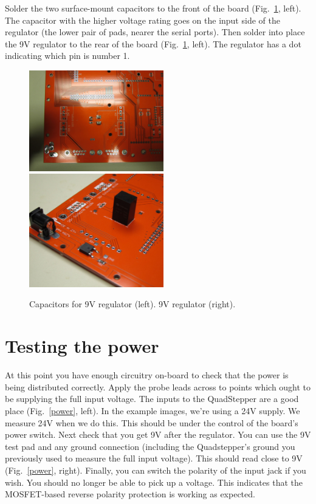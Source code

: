 \documentclass[11pt]{report} %
\begin{document}
\clearpage

Solder the two surface-mount capacitors to the front of the board (Fig.~\ref{9V}, left). The capacitor with the higher voltage rating goes on the input side of the regulator (the lower pair of pads, nearer the serial ports). Then solder into place the 9V regulator to the rear of the board (Fig.~\ref{9V}, left). The regulator has a dot indicating which pin is number 1. 


\begin{figure}[!ht]
\centering
\includegraphics[width=2.3in]{IMG_3193.JPG}
\includegraphics[width=2.3in]{IMG_3191.JPG}
\caption{Capacitors for 9V regulator (left). 9V regulator (right).}
\label{9V}
\end{figure}

\clearpage

\section{Testing the power}
At this point you have enough circuitry on-board to check that the power is being distributed correctly. Apply the probe leads across to points which ought to be supplying the full input voltage. The inputs to the QuadStepper are a good place (Fig.~\ref{power}, left). In the example images, we're using a 24V supply. We measure 24V when we do this. This should be under the control of the board's power switch. Next check that you get 9V after the regulator. You can use the 9V test pad and any ground connection (including the Quadstepper's ground you previously used to measure the full input voltage). This should read close to 9V (Fig.~\ref{power}, right). Finally, you can switch the polarity of the input jack if you wish. You should no longer be able to pick up a voltage. This indicates that the MOSFET-based reverse polarity protection is working as expected. 
\end{document}
